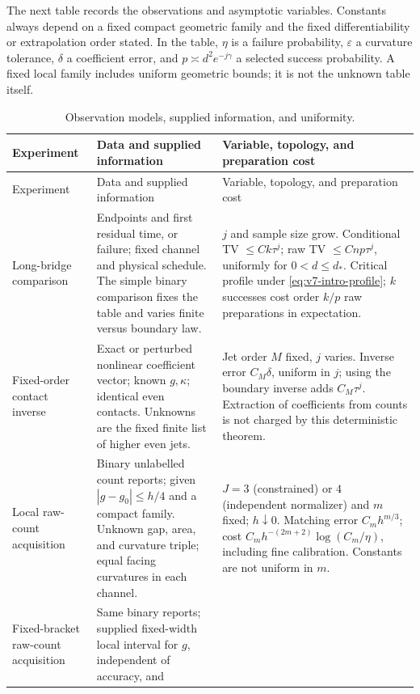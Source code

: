 The next table records the observations and asymptotic variables.
Constants always depend on a fixed compact geometric family and the
fixed differentiability or extrapolation order stated. In the table,
$\eta$ is a failure probability, $\varepsilon$ a curvature tolerance,
$\delta$ a coefficient error, and $p\asymp d^2e^{-j\gamma}$ a
selected success probability. A fixed local family includes uniform
geometric bounds; it is not the unknown table itself.

\begingroup
\small
\setlength{\tabcolsep}{4pt}
\renewcommand{\arraystretch}{1.12}
\begin{longtable}{@{}p{}p{}p{}@{}}
\caption{Observation models, supplied information, and uniformity.}
\label{tab:v7-experiments}\\
\toprule
Experiment & Data and supplied information & Variable, topology, and preparation cost\\
\midrule
\endfirsthead
\toprule
Experiment & Data and supplied information & Variable, topology, and preparation cost\\
\midrule
\endhead
Long-bridge comparison & Endpoints and first residual time, or failure;
fixed channel and physical schedule. The simple binary comparison fixes
the table and varies finite versus boundary law. & $j$ and sample size
grow. Conditional TV $\le Ck\tau^j$; raw TV $\le Cnp\tau^j$, uniformly
for $0<d\le d_*$. Critical profile under
\eqref{eq:v7-intro-profile}; $k$ successes cost order $k/p$ raw
preparations in expectation.\\[3pt]
Fixed-order contact inverse & Exact or perturbed nonlinear coefficient
vector; known $g,\kappa$; identical even contacts. Unknowns are the
fixed finite list of higher even jets. & Jet order $M$ fixed, $j$ varies.
Inverse error $C_M\delta$, uniform in $j$; using the boundary inverse
adds $C_M\tau^j$. Extraction of coefficients from counts is not charged
by this deterministic theorem.\\[3pt]
Local raw-count acquisition & Binary unlabelled count reports; given
$|g-g_0|\le h/4$ and a compact family. Unknown gap, area, and curvature
triple; equal facing curvatures in each channel. & $J=3$ (constrained)
or $4$ (independent normalizer) and $m$ fixed; $h\downarrow0$.
Matching error $C_mh^{m/3}$; cost
$C_mh^{-(2m+2)}\log(C_m/\eta)$, including fine calibration.
Constants are not uniform in $m$.\\[3pt]
Fixed-bracket raw-count acquisition & Same binary reports; supplied
fixed-width local interval for $g$, independent of accuracy, and

\end{longtable}
